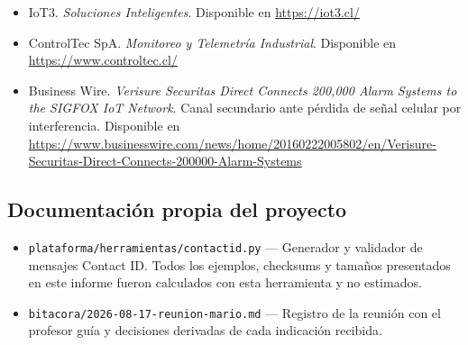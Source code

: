 \begin{itemize}[leftmargin=1.2em]
\item IoT3. \emph{Soluciones Inteligentes}. Disponible en \url{https://iot3.cl/}

\item ControlTec SpA. \emph{Monitoreo y Telemetría Industrial}. Disponible en
\url{https://www.controltec.cl/}

\item Business Wire. \emph{Verisure Securitas Direct Connects 200,000 Alarm Systems to the SIGFOX IoT
Network}. Canal secundario ante pérdida de señal celular por interferencia. Disponible en
\url{https://www.businesswire.com/news/home/20160222005802/en/Verisure-Securitas-Direct-Connects-200000-Alarm-Systems}
\end{itemize}

\subsection*{Documentación propia del proyecto}

\begin{itemize}[leftmargin=1.2em]
\item \texttt{plataforma/herramientas/contactid.py} --- Generador y validador de mensajes Contact ID.
Todos los ejemplos, checksums y tamaños presentados en este informe fueron calculados con esta
herramienta y no estimados.

\item \texttt{bitacora/2026-08-17-reunion-mario.md} --- Registro de la reunión con el profesor guía y
decisiones derivadas de cada indicación recibida.
\end{itemize}
